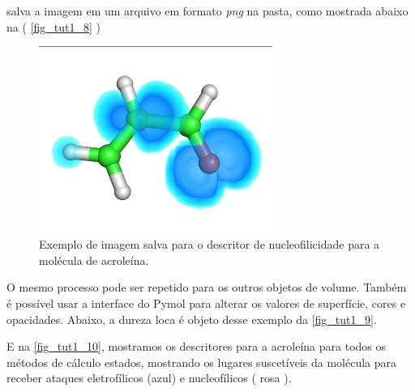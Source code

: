 \documentclass[a4paper,11pt]{refart}
\begin{document}
salva a imagem em um arquivo em formato \textit{png} na pasta, como mostrada abaixo na ( \autoref{fig_tut1_8} )


\hspace*{-\leftmarginwidth}
\begin{minipage}{\fullwidth}
\begin{figure}[H]
\begin{center}
\includegraphics[width=3in]{images/img9}
\caption{Exemplo de imagem salva para o descritor de nucleofilicidade para a molécula de acroleína.}
\label{fig_tut1_8}
\end{center}
\end{figure}
\end{minipage}

O mesmo processo pode ser repetido para os outros objetos de volume. Também é possível usar a interface do Pymol para alterar os valores de superfície, cores e opacidades. Abaixo, a dureza loca é objeto desse exemplo da \autoref{fig_tut1_9}.

E na \autoref{fig_tut1_10}, mostramos os descritores para a acroleína para todos os métodos de cálculo estados, mostrando os lugares suscetíveis da molécula para receber ataques eletrofílicos (azul) e nucleofílicos ( rosa ).
\end{document}
